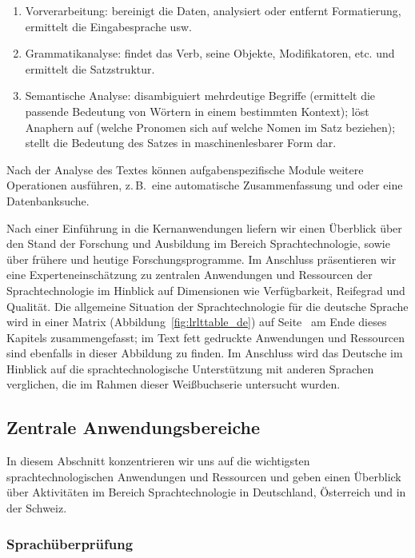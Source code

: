 \documentclass[]{../../metanetpaper}
\begin{document}
\begin{multicols}{2}
\begin{enumerate}
\item Vorverarbeitung: bereinigt die Daten, analysiert oder entfernt Formatierung, ermittelt die Eingabesprache usw.
\item Grammatikanalyse: findet das Verb, seine Objekte, Modifikatoren, etc. und ermittelt die Satzstruktur.
\item Semantische Analyse: disambiguiert mehrdeutige Begriffe (ermittelt die passende Bedeutung von Wörtern in einem bestimmten Kontext); löst Anaphern auf (welche Pronomen sich auf welche Nomen im Satz beziehen); stellt die Bedeutung des Satzes in maschinenlesbarer Form dar.
\end{enumerate}

Nach der Analyse des Textes können aufgabenspezifische Module weitere Operationen ausführen, z.\,B.~eine automatische Zusammenfassung und oder eine Datenbanksuche. 

Nach einer Einführung in die Kernanwendungen liefern wir einen Überblick über den Stand der Forschung und Ausbildung im Bereich Sprachtechnologie, sowie über frühere und heutige Forschungsprogramme. Im Anschluss präsentieren wir eine Experteneinschätzung zu zentralen Anwendungen und Ressourcen der Sprachtechnologie im Hinblick auf Dimensionen wie Verfügbarkeit, Reifegrad und Qualität. Die allgemeine Situation der Sprachtechnologie für die deutsche Sprache wird in einer Matrix (Abbildung~\ref{fig:lrlttable_de}) auf Seite~\pageref{fig:lrlttable_de} am Ende dieses Kapitels zusammengefasst; im Text fett gedruckte Anwendungen und Ressourcen sind ebenfalls in dieser Abbildung zu finden. Im Anschluss wird das Deutsche im Hinblick auf die sprachtechnologische Unterstützung mit anderen Sprachen verglichen, die im Rahmen dieser Weißbuchserie untersucht wurden.

\subsection{Zentrale Anwendungsbereiche} 

In diesem Abschnitt konzentrieren wir uns auf die wichtigsten sprachtechnologischen Anwendungen und Ressourcen und geben einen Überblick über Aktivitäten im Bereich Sprachtechnologie in Deutschland, Österreich und in der Schweiz. 

\subsubsection{Sprachüberprüfung}


\end{multicols}
\end{document}
